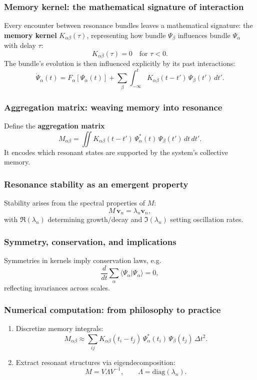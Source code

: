 \subsubsection{Memory kernel: the mathematical signature of interaction}

Every encounter between resonance bundles leaves a mathematical signature: the \textbf{memory kernel} \(K_{\alpha\beta}(\tau)\), representing how bundle \(\Psi_\beta\) influences bundle \(\Psi_\alpha\) with delay \(\tau\):
\[
  K_{\alpha\beta}(\tau)=0 \quad \text{for } \tau<0.
\]
The bundle’s evolution is then influenced explicitly by its past interactions:
\[
  \dot{\Psi}_\alpha(t)
  = F_\alpha[\Psi_\alpha(t)]
  + \sum_{\beta}\int_{-\infty}^{t} K_{\alpha\beta}(t-t')\,\Psi_\beta(t')\,dt'.
\]

\subsubsection{Aggregation matrix: weaving memory into resonance}

Define the \textbf{aggregation matrix}
\[
  M_{\alpha\beta}
  = \iint K_{\alpha\beta}(t-t')\,\Psi_\alpha^*(t)\,\Psi_\beta(t')\,dt\,dt'.
\]
It encodes which resonant states are supported by the system’s collective memory.

\subsubsection{Resonance stability as an emergent property}

Stability arises from the spectral properties of \(M\):
\[
  M\,\mathbf{v}_n = \lambda_n \mathbf{v}_n,
\]
with \(\Re(\lambda_n)\) determining growth/decay and \(\Im(\lambda_n)\) setting oscillation rates.

\subsubsection{Symmetry, conservation, and implications}

Symmetries in kernels imply conservation laws, e.g.
\[
  \frac{d}{dt}\sum_{\alpha}\langle\Psi_\alpha|\Psi_\alpha\rangle=0,
\]
reflecting invariances across scales.

\subsubsection{Numerical computation: from philosophy to practice}

\begin{enumerate}[leftmargin=1.5em]
  \item Discretize memory integrals:
  \[
    M_{\alpha\beta}\approx\sum_{ij}K_{\alpha\beta}(t_i-t_j)\,\Psi_\alpha^*(t_i)\,\Psi_\beta(t_j)\,\Delta t^2.
  \]
  \item Extract resonant structures via eigendecomposition:
  \[
    M=V\Lambda V^{-1},\qquad \Lambda=\mathrm{diag}(\lambda_n).
  \]
\end{enumerate}

